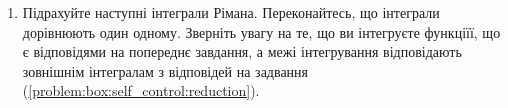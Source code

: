 \begin{enumerate}
\begin{enumerate}[label*=\arabic*.]
\end{enumerate}
\item\label{problem:box:self_control:outer} Підрахуйте наступні інтеграли Рімана. Переконайтесь, що інтеграли дорівнюють один одному. Зверніть увагу на те, що ви інтегруєте функціїї, що є відповідями на попереднє завдання, а межі інтегрування відповідають зовнішнім інтегралам з відповідей на задвання (\ref{problem:box:self_control:reduction}).
\par\noindent
\begin{minipage}{14.5cm}
\begin{enumerate}[label*=\arabic*.]

\end{enumerate}
\end{minipage}
\end{enumerate}
